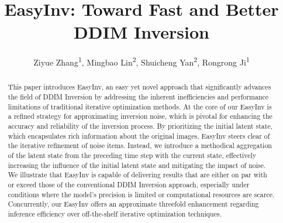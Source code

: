 \documentclass[letterpaper]{article} %
\begin{document}
\title{EasyInv: Toward Fast and Better DDIM Inversion}
\author {
    Ziyue Zhang\textsuperscript{\rm 1},
    Mingbao Lin\textsuperscript{\rm 2},
    Shuicheng Yan\textsuperscript{\rm 2},
    Rongrong Ji\textsuperscript{\rm 1}
}

\maketitle

\begin{abstract}
This paper introduces EasyInv, an easy yet novel approach that significantly advances the field of DDIM Inversion by addressing the inherent inefficiencies and performance limitations of traditional iterative optimization methods.
%
At the core of our EasyInv is a refined strategy for approximating inversion noise, which is pivotal for enhancing the accuracy and reliability of the inversion process.
%
By prioritizing the initial latent state, which encapsulates rich information about the original images, EasyInv steers clear of the iterative refinement of noise items. 
%
Instead, we introduce a methodical aggregation of the latent state from the preceding time step with the current state, effectively increasing the influence of the initial latent state and mitigating the impact of noise.
%
We illustrate that EasyInv is capable of delivering results that are either on par with or exceed those of the conventional DDIM Inversion approach, especially under conditions where the model's precision is limited or computational resources are scarce. Concurrently, our EasyInv offers an approximate threefold enhancement regarding inference efficiency over off-the-shelf iterative optimization techniques.
\end{abstract}

%
\end{document}
